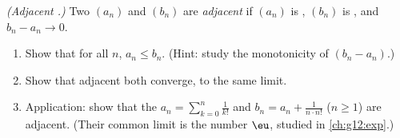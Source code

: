 \begin{exercise}[$\star\star\star$]\label{exo:g12:seq:10}
\emph{(Adjacent .)} Two  $(a_n)$ and $(b_n)$ are
\emph{adjacent} if $(a_n)$ is , $(b_n)$ is , and
$b_n - a_n \to 0$.
\begin{enumerate}
  \item Show that for all $n$, $a_n \leq b_n$. (Hint: study the monotonicity
        of $(b_n - a_n)$.)
  \item Show that adjacent  both converge, to the same limit.
  \item Application: show that the 
        $a_n = \sum_{k=0}^{n} \frac{1}{k!}$ and
        $b_n = a_n + \frac{1}{n \cdot n!}$ ($n \geq 1$) are adjacent. (Their
        common limit is the number $\eu$, studied in \cref{ch:g12:exp}.)
\end{enumerate}
\end{exercise}

